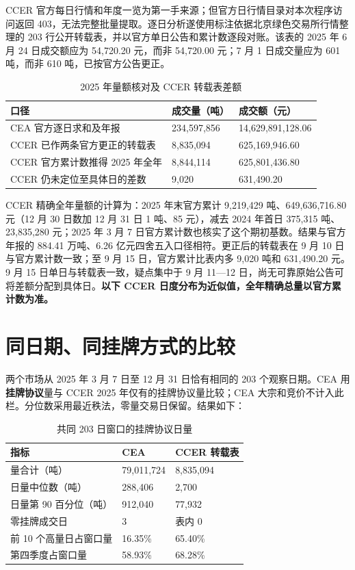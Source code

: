 \documentclass[UTF8,a4paper,11pt,oneside,fontset=fandol]{ctexart}
\begin{document}
CCER 官方每日行情和年度一览为第一手来源\cite{ccer2025annual}；但官方日行情目录对本次程序访问返回 403，无法完整批量提取。逐日分析遂使用标注依据北京绿色交易所行情整理的 203 行公开转载表\cite{ccn2025daily}，并以官方单日公告和累计数逐段对账。该表的 2025 年 6 月 24 日成交额应为 54,720.20 元，而非 54,720.00 元；7 月 1 日成交量应为 601 吨，而非 610 吨，已按官方公告更正\cite{ccer2025jun24,ccer2025jul01}。

\begin{table}[htbp]
\centering\small
\caption{2025 年量额核对及 CCER 转载表差额}
\begin{tabularx}{\textwidth}{@{}L{0.43\textwidth}XX@{}}
\toprule
口径 & 成交量（吨） & 成交额（元）\\
\midrule
CEA 官方逐日求和及年报 & 234,597,856 & 14,629,891,128.06\\
CCER 已作两条官方更正的转载表 & 8,835,094 & 625,169,946.60\\
CCER 官方累计数推得 2025 年全年 & 8,844,114 & 625,801,436.80\\
CCER 仍未定位至具体日的差数 & 9,020 & 631,490.20\\
\bottomrule
\end{tabularx}
\end{table}

CCER 精确全年量额的计算为：2025 年末官方累计 9,219,429 吨、649,636,716.80 元（12 月 30 日数加 12 月 31 日 1 吨、85 元），减去 2024 年首日 375,315 吨、23,835,280 元；2025 年 3 月 7 日官方累计数也核实了这个期初基数\cite{ccer2025annual,ccer2024jan22,ccer2025mar07,ccer2025dec30}。结果与官方年报的 884.41 万吨、6.26 亿元四舍五入口径相符。更正后的转载表在 9 月 10 日与官方累计数一致；至 9 月 15 日，官方累计比表内多 9,020 吨和 631,490.20 元\cite{ccer2025sep10,ccer2025sep15}。9 月 15 日单日与转载表一致，疑点集中于 9 月 11—12 日，尚无可靠原始公告可将差额分配到具体日。\textbf{以下 CCER 日度分布为近似值，全年精确总量以官方累计数为准。}

\section{同日期、同挂牌方式的比较}
两个市场从 2025 年 3 月 7 日至 12 月 31 日恰有相同的 203 个观察日期。CEA 用\textbf{挂牌协议}量与 CCER 2025 年仅有的挂牌协议量比较；CEA 大宗和竞价不计入此栏。分位数采用最近秩法，零量交易日保留。结果如下：

\begin{table}[htbp]
\centering\small
\caption{共同 203 日窗口的挂牌协议日量}
\begin{tabularx}{\textwidth}{@{}L{0.49\textwidth}XX@{}}
\toprule
指标 & CEA & CCER 转载表\\
\midrule
量合计（吨） & 79,011,724 & 8,835,094\\
日量中位数（吨） & 288,406 & 2,700\\
日量第 90 百分位（吨） & 912,040 & 77,932\\
零挂牌成交日 & 3 & 表内 0\\
前 10 个高量日占窗口量 & 16.35\% & 65.40\%\\
第四季度占窗口量 & 58.93\% & 68.28\%\\
\bottomrule
\end{tabularx}
\end{table}
\end{document}
